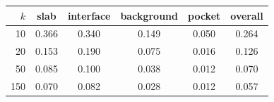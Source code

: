\begin{tabular}{r cccc c}
\hline
$k$ & slab & interface & background & pocket & overall \\
\hline
10 & 0.366 & 0.340 & 0.149 & 0.050 & 0.264 \\
20 & 0.153 & 0.190 & 0.075 & 0.016 & 0.126 \\
50 & 0.085 & 0.100 & 0.038 & 0.012 & 0.070 \\
150 & 0.070 & 0.082 & 0.028 & 0.012 & 0.057 \\
\hline
\end{tabular}
